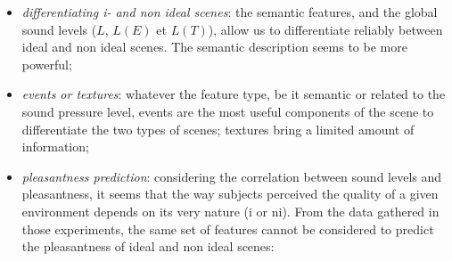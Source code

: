 \documentclass[12pt]{elsarticle}
\begin{document}
\begin{itemize}


\item \emph{differentiating i- and non ideal scenes}: the semantic features, and the global sound levels ($L$, $L(E)$ et $L(T)$), allow us to differentiate reliably between ideal and non ideal scenes. The semantic description seems to be more powerful;
\item \emph{events or textures}: whatever the feature type, be it semantic or related to the sound pressure level, events are the most useful components of the scene to differentiate the two types of scenes; textures bring a limited amount of information;
\item \emph{pleasantness prediction}: considering the correlation between sound levels and pleasantness, it seems that the way subjects perceived the quality of a given environment depends on its very nature (i or ni). From the data gathered in those experiments, the same set of features cannot be considered to predict the pleasantness of ideal and non ideal scenes:

\begin{itemize}



\end{itemize}
\end{itemize}
\end{document}
